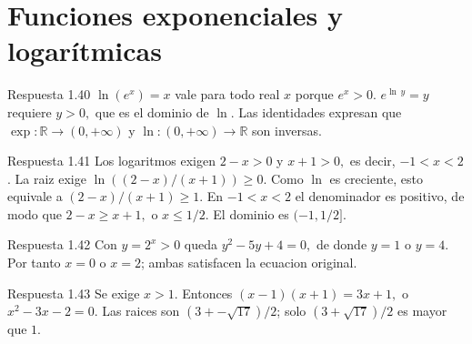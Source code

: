 \documentclass[10pt,a4paper,oneside,openany]{book}
\begin{document}
\section{Funciones exponenciales y logarítmicas}
\begin{PSevenAnswerFixed}{Respuesta 1.40}
\(\ln(e^x)=x\) vale para todo real \(x\) porque \(e^x>0\). \(e^{\ln\,y}=y\) requiere \(y>0,\) que es el dominio de \(\ln\). Las identidades expresan que \(\exp:\mathbb{R}\to (0,+\infty )\) y \(\ln:(0,+\infty )\to \mathbb{R}\) son inversas.
\end{PSevenAnswerFixed}
\begin{PSevenAnswerFixed}{Respuesta 1.41}
Los logaritmos exigen \(2-x>0\) y \(x+1>0,\) es decir, \(-1<x<2\). La raiz exige \(\ln((2-x)/(x+1))\ge 0\). Como \(\ln\) es creciente, esto equivale a \((2-x)/(x+1)\ge 1\). En \(-1<x<2\) el denominador es positivo, de modo que \(2-x\ge x+1,\) o \(x\le 1/2\). El dominio es \((-1,1/2]\).
\end{PSevenAnswerFixed}
\begin{PSevenAnswerFixed}{Respuesta 1.42}
Con \(y=2^x>0\) queda \(y^{2}-5y+4=0,\) de donde \(y=1\) o \(y=4\). Por tanto \(x=0\) o \(x=2\); ambas satisfacen la ecuacion original.
\end{PSevenAnswerFixed}
\begin{PSevenAnswerFixed}{Respuesta 1.43}
Se exige \(x>1\). Entonces \((x-1)(x+1)=3x+1,\) o \(x^{2}-3x-2=0\). Las raices son \((3+-\sqrt{17})/2\); solo \((3+\sqrt{17})/2\) es mayor que \(1\).
\end{PSevenAnswerFixed}
\end{document}
